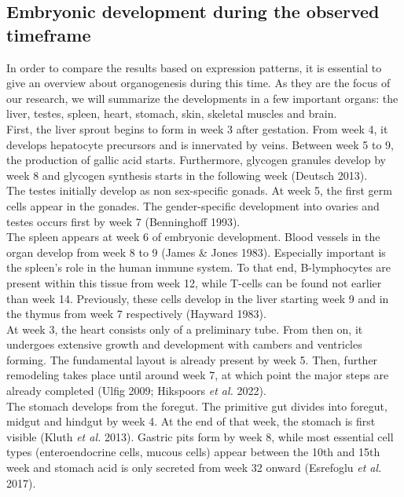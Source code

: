 \documentclass[
]{article}
\begin{document}
\hypertarget{intro-tissues}{%
\subsection{Embryonic development during the observed timeframe}\label{intro-tissues}}

In order to compare the results based on expression patterns, it is essential to give an overview about organogenesis during this time. As they are the focus of our research, we will summarize the developments in a few important organs: the liver, testes, spleen, heart, stomach, skin, skeletal muscles and brain.\\
First, the liver sprout begins to form in week 3 after gestation. From week 4, it develops hepatocyte precursors and is innervated by veins. Between week 5 to 9, the production of gallic acid starts. Furthermore, glycogen granules develop by week 8 and glycogen synthesis starts in the following week (Deutsch 2013).\\
The testes initially develop as non sex-specific gonads. At week 5, the first germ cells appear in the gonades. The gender-specific development into ovaries and testes occurs first by week 7 (Benninghoff 1993).\\
The spleen appears at week 6 of embryonic development. Blood vessels in the organ develop from week 8 to 9 (James \& Jones 1983). Especially important is the spleen's role in the human immune system. To that end, B-lymphocytes are present within this tissue from week 12, while T-cells can be found not earlier than week 14. Previously, these cells develop in the liver starting week 9 and in the thymus from week 7 respectively (Hayward 1983).\\
At week 3, the heart consists only of a preliminary tube. From then on, it undergoes extensive growth and development with cambers and ventricles forming. The fundamental layout is already present by week 5. Then, further remodeling takes place until around week 7, at which point the major steps are already completed (Ulfig 2009; Hikspoors \emph{et al.} 2022).\\
The stomach develops from the foregut. The primitive gut divides into foregut, midgut and hindgut by week 4. At the end of that week, the stomach is first visible (Kluth \emph{et al.} 2013). Gastric pits form by week 8, while most essential cell types (enteroendocrine cells, mucous cells) appear between the 10th and 15th week and stomach acid is only secreted from week 32 onward (Esrefoglu \emph{et al.} 2017).\\
\end{document}
